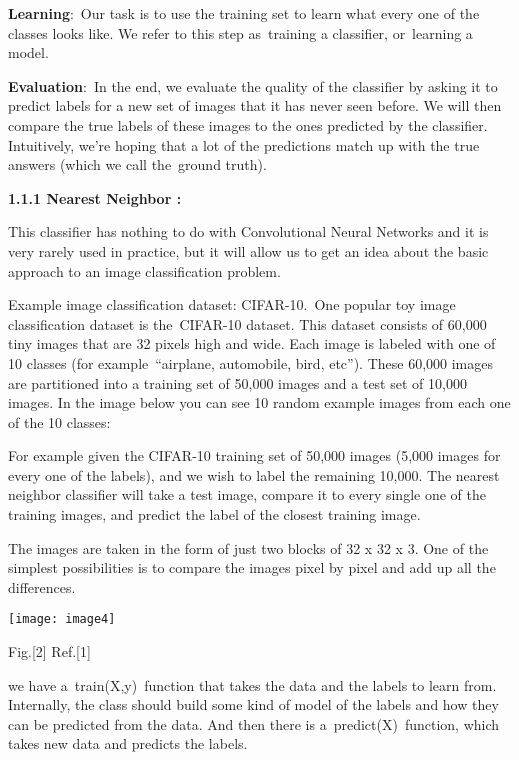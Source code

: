 \documentclass{article} %
\begin{document}
\noindent \textbf{Learning}:~Our task is to use the training set to learn what every one of the classes looks like. We refer to this step as~training a classifier, or~learning a model.

\noindent \textbf{Evaluation}:~In the end, we evaluate the quality of the classifier by asking it to predict labels for a new set of images that it has never seen before. We will then compare the true labels of these images to the ones predicted by the classifier. Intuitively, we're hoping that a lot of the predictions match up with the true answers (which we call the~ground truth).

\noindent \textbf{}

\noindent \textbf{1.1.1 Nearest Neighbor :}

\noindent                    This classifier has nothing to do with Convolutional Neural Networks and it is very rarely used in practice, but it will allow us to get an idea about the basic approach to an image classification problem.

\noindent Example image classification dataset: CIFAR-10.~One popular toy image classification dataset is the~CIFAR-10 dataset. This dataset consists of 60,000 tiny images that are 32 pixels high and wide. Each image is labeled with one of 10 classes (for example~``airplane, automobile, bird, etc''). These 60,000 images are partitioned into a training set of 50,000 images and a test set of 10,000 images. In the image below you can see 10 random example images from each one of the 10 classes:

\noindent For example  given the CIFAR-10 training set of 50,000 images (5,000 images for every one of the labels), and we wish to label the remaining 10,000. The nearest neighbor classifier will take a test image, compare it to every single one of the training images, and predict the label of the closest training image. 

\noindent         The images are taken in the form of just two blocks of 32 x 32 x 3. One of the simplest possibilities is to compare the images pixel by pixel and add up all the differences.

\noindent \texttt{[image: image4]}

\noindent Fig.[2]   Ref.[1]

\noindent                we have a~train(X,y)~function that takes the data and the labels to learn from. Internally, the class should build some kind of model of the labels and how they can be predicted from the data. And then there is a~predict(X)~function, which takes new data and predicts the labels. 
\end{document}
